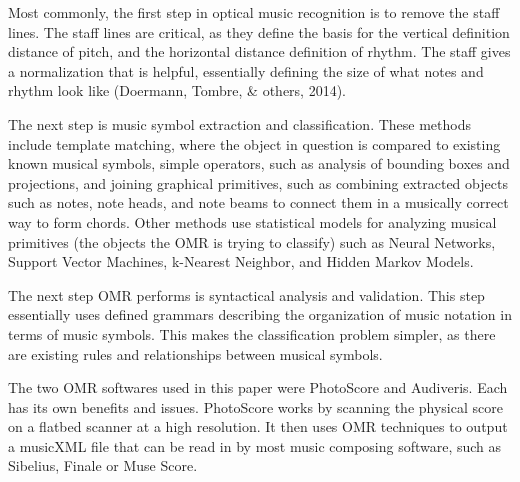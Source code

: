 \documentclass[12pt,twoside]{reedthesis}
\theoremstyle{definition}
\theoremstyle{definition}
\theoremstyle{definition}
\theoremstyle{remark}
\begin{document}
Most commonly, the first step in optical music recognition is to remove
the staff lines. The staff lines are critical, as they define the basis
for the vertical definition distance of pitch, and the horizontal
distance definition of rhythm. The staff gives a normalization that is
helpful, essentially defining the size of what notes and rhythm look
like (Doermann, Tombre, \& others, 2014).

The next step is music symbol extraction and classification. These
methods include template matching, where the object in question is
compared to existing known musical symbols, simple operators, such as
analysis of bounding boxes and projections, and joining graphical
primitives, such as combining extracted objects such as notes, note
heads, and note beams to connect them in a musically correct way to form
chords. Other methods use statistical models for analyzing musical
primitives (the objects the OMR is trying to classify) such as Neural
Networks, Support Vector Machines, k-Nearest Neighbor, and Hidden Markov
Models.

The next step OMR performs is syntactical analysis and validation. This
step essentially uses defined grammars describing the organization of
music notation in terms of music symbols. This makes the classification
problem simpler, as there are existing rules and relationships between
musical symbols.

The two OMR softwares used in this paper were PhotoScore and Audiveris.
Each has its own benefits and issues. PhotoScore works by scanning the
physical score on a flatbed scanner at a high resolution. It then uses
OMR techniques to output a musicXML file that can be read in by most
music composing software, such as Sibelius, Finale or Muse Score.
\end{document}
